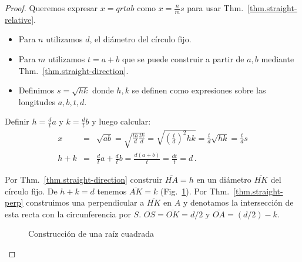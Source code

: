 \begin{proof}
Queremos expresar $x=qrt{ab}$ como $x=\displaystyle\frac{n}{m}s$ para usar Thm.~\ref{thm.straight-relative}.
\begin{itemize}
\setlength{\itemsep}{0pt}
\item Para $n$ utilizamos $d$, el diámetro del círculo fijo.
\item Para $m$ utilizamos $t=a+b$ que se puede construir a partir de $a,b$ mediante Thm.~\ref{thm.straight-direction}.
\item Definimos $s=\sqrt{hk}$ donde $h,k$ se definen como expresiones sobre las longitudes $a,b,t,d$.
\end{itemize}
Definir $h=\displaystyle\frac{d}{t}a$ y $k=\displaystyle\frac{d}{t}b$ y luego calcular:
\begin{eqnarray*}
x&=&\sqrt{ab}=\sqrt{\frac{th}{d}\frac{tk}{d}}=\sqrt{\left(\frac{t}{d}\right)^2hk}=\frac{t}{d}\sqrt{hk}=\frac{t}{d}s\\
h+k &=& \frac{d}{t}a + \frac{d}{t}b = \frac{d(a+b)}{t} = \frac{dt}{t} = d\,.
\end{eqnarray*}

Por Thm.~\ref{thm.straight-direction} construir $\overline{HA}= h$ en un diámetro $\overline{HK}$ del círculo fijo. De $h+k=d$ tenemos $\overline{AK}=k$ (Fig.~\ref{f.se-sqrt}). Por Thm.~\ref{thm.straight-perp} construimos una perpendicular a $\overline{HK}$ en $A$ y denotamos la intersección de esta recta con la circunferencia por $S$. $\overline{OS}=\overline{OK}=d/2$ y $\overline{OA}=(d/2)-k$. 
\begin{figure}[t]
\begin{center}
\end{center}
\caption{Construcción de una raíz cuadrada}\label{f.se-sqrt}
\end{figure}


\end{proof}
